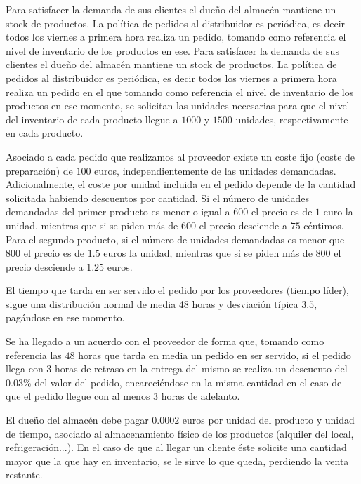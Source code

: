 \documentclass[a4paper,12pt]{article}
\begin{document}
	Para satisfacer la demanda de sus clientes el dueño del almacén mantiene un stock de productos. La política de pedidos al distribuidor es periódica, es decir todos los viernes a primera hora realiza un pedido, tomando como referencia el nivel de inventario de los productos en ese. Para satisfacer la demanda de sus clientes el dueño del almacén mantiene un stock de productos. La política de pedidos al distribuidor es periódica, es decir todos los viernes a primera hora realiza un pedido en el que tomando como referencia el nivel de inventario de los productos en ese momento, se solicitan las unidades necesarias para que el nivel del inventario de cada producto llegue a $1000$ y $1500$ unidades, respectivamente en cada producto.

	Asociado a cada pedido que realizamos al proveedor existe un coste fijo (coste de preparación) de $100$ euros, independientemente de las unidades demandadas. Adicionalmente, el coste por unidad incluida en el pedido depende de la cantidad solicitada habiendo descuentos por cantidad. Si el número de unidades demandadas del primer producto es menor o igual a $600$ el precio es de $1$ euro la unidad, mientras que si se piden más de $600$ el precio desciende a $75$ céntimos. Para el segundo producto, si el número de unidades demandadas es menor que $800$ el precio es de $1.5$ euros la unidad, mientras que si se piden más de $800$ el precio desciende a $1.25$ euros.

	El tiempo que tarda en ser servido el pedido por los proveedores (tiempo líder), sigue una distribución normal de media 48 horas y desviación típica $3.5$, pagándose en ese momento.

	Se ha llegado a un acuerdo con el proveedor de forma que, tomando como referencia las $48$ horas que tarda en media un pedido en ser servido, si el pedido llega con $3$ horas de retraso en la entrega del mismo se realiza un descuento del $0.03\%$ del valor del pedido, encareciéndose en la misma cantidad en el caso de que el pedido llegue con al menos $3$ horas de adelanto.
	
	El dueño del almacén debe pagar $0.0002$ euros por unidad del producto y unidad de tiempo, asociado al almacenamiento físico de los productos (alquiler del local, refrigeración...). En el caso de que al llegar un cliente éste solicite una cantidad mayor que la que hay en inventario, se le sirve lo que queda, perdiendo la venta restante.
	
\end{document}
